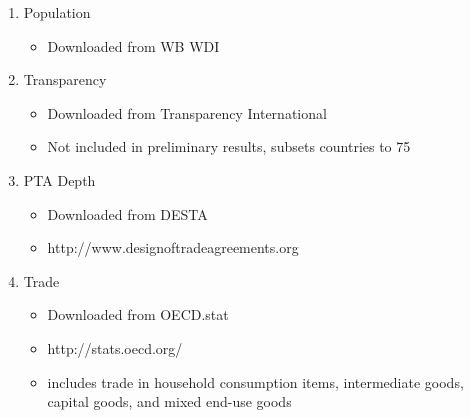 \documentclass{article}
\begin{document}
\begin{enumerate}
\begin{itemize}
		\end{itemize}
	\item {Population}
		\begin{itemize}
			\item{Downloaded from WB WDI}
		\end{itemize}
	\item {Transparency}
		\begin{itemize}
			\item{Downloaded from Transparency International}
			\item{Not included in preliminary results, subsets countries to 75}
		\end{itemize}
	\item {PTA Depth}
		\begin{itemize}
			\item{Downloaded from DESTA}
			\item{http://www.designoftradeagreements.org}
		\end{itemize}
	\item {Trade}
		\begin{itemize}
			\item{Downloaded from OECD.stat}
			\item{http://stats.oecd.org/}
			\item{includes trade in household consumption items, intermediate goods, capital goods, and mixed end-use goods}
		\end{itemize}
		
\end{enumerate}
\end{document}
